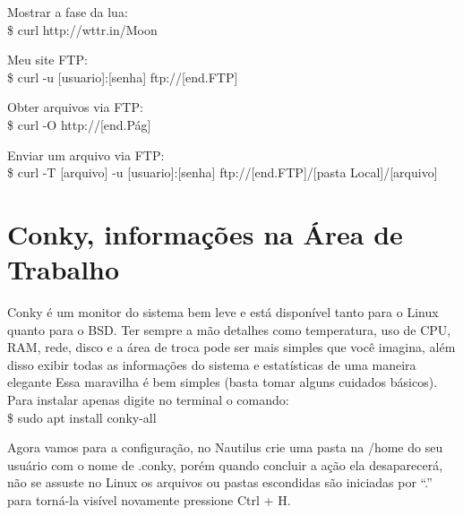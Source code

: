 Mostrar a fase da lua: \\
{\ttfamily\$ curl http://wttr.in/Moon}

Meu site FTP: \\
{\ttfamily\$ curl -u [usuario]:[senha] ftp://[end.FTP]}

Obter arquivos via FTP: \\
{\ttfamily\$ curl -O http://[end.Pág]}

Enviar um arquivo via FTP: \\
{\ttfamily\$ curl -T [arquivo] -u [usuario]:[senha] ftp://[end.FTP]/[pasta Local]/[arquivo]}

\section{Conky, informações na Área de Trabalho}
Conky é um monitor do sistema bem leve e está disponível tanto para o Linux quanto para o BSD. Ter sempre a mão detalhes como temperatura, uso de CPU, RAM, rede, disco e a área de troca pode ser mais simples que você imagina, além disso exibir todas as informações do sistema e estatísticas de uma maneira elegante Essa maravilha é bem simples (basta tomar alguns cuidados básicos). \\[3mm]
Para instalar apenas digite no terminal o comando: \\
{\ttfamily\$ sudo apt install conky-all}

Agora vamos para a configuração, no Nautilus crie uma pasta na /home do seu usuário com o nome de .conky, porém quando concluir a ação ela desaparecerá, não se assuste no Linux os arquivos ou pastas escondidas são iniciadas por ``.'' para torná-la visível novamente pressione Ctrl + H.

